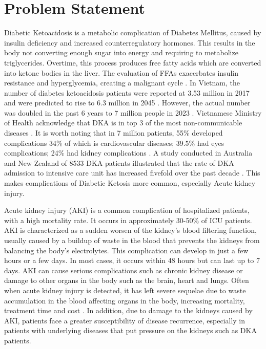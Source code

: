 \documentclass[../main.tex]{subfiles}
\begin{document}
\section{Problem Statement}
\label{sec:dvd}

Diabetic Ketoacidosis is a metabolic complication of Diabetes Mellitus, caused by insulin deficiency and increased counterregulatory hormones.
This results in the body not converting enough sugar into energy and requiring to metabolize triglycerides.
Overtime, this process produces free fatty acids which are converted into ketone bodies in the liver.
The evaluation of FFAs exacerbates insulin resistance and hyperglycemia, creating a malignant cycle \cite{dka-info}.
In Vietnam, the number of diabetes ketoacidosis patients were reported at 3.53 million in 2017 \cite{vn-dka-3.5-2019} and were predicted to rise to 6.3 million in 2045 \cite{vn-dka-predict-6.3-2045}.
However, the actual number was doubled in the past 6 years to 7 million people in 2023 \cite{vn-dka-7-2023}.
Vietnamese Ministry of Health acknowledge that DKA is in top 3 of the most non-communicable diseases \cite{vn-dka-predict-6.3-2045}.
It is worth noting that in 7 million patients, 55\% developed complications 34\% of which is cardiovascular diseases; 39.5\% had eyes complications; 24\% had kidney complications \cite{vn-dka-7-2023}.
A study conducted in Australia and New Zealand of 8533 DKA patients illustrated that the rate of DKA admission to intensive care unit has increased fivefold over the past decade \cite{aus+nz-dka-icu-increase}.
This makes complications of Diabetic Ketosis more common, especially Acute kidney injury.

Acute kidney injury (AKI) is a common complication of hospitalized patients, with a high mortality rate.
It occurs in approximately 30-50\% of ICU patients.
AKI is characterized as a sudden worsen of the kidney's blood filtering function, usually caused by a buildup of waste in the blood that prevents the kidneys from balancing the body's electrolytes.
This complication can develop in just a few hours or a few days.
In most cases, it occurs within 48 hours but can last up to 7 days.
AKI can cause serious complications such as chronic kidney disease or damage to other organs in the body such as the brain, heart and lungs.
Often when acute kidney injury is detected, it has left severe sequelae due to waste accumulation in the blood affecting organs in the body, increasing mortality, treatment time and cost \cite{kdigo-aki-guideline}.
In addition, due to damage to the kidneys caused by AKI, patients face a greater susceptibility of disease recurrence, especially in patients with underlying diseases that put pressure on the kidneys such as DKA patients.
\end{document}
